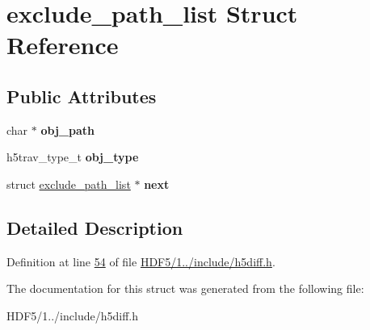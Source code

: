 \hypertarget{structexclude__path__list}{}\section{exclude\+\_\+path\+\_\+list Struct Reference}
\label{structexclude__path__list}
\subsection*{Public Attributes}
\begin{DoxyCompactItemize}
\item 
\mbox{\label{structexclude__path__list_a0157dcb15f3e49e223ed56a7cedceeb7}} 
char $\ast$ {\bfseries obj\+\_\+path}
\item 
\mbox{\label{structexclude__path__list_ae5cb2bf26a07b1663dd487aa71bb039b}} 
h5trav\+\_\+type\+\_\+t {\bfseries obj\+\_\+type}
\item 
\mbox{\label{structexclude__path__list_a2f3f2001e98c8ed7c3cad97385708e04}} 
struct \hyperlink{structexclude__path__list}{exclude\+\_\+path\+\_\+list} $\ast$ {\bfseries next}
\end{DoxyCompactItemize}


\subsection{Detailed Description}


Definition at line \hyperlink{_h_d_f5_21_810_81_2include_2h5diff_8h_source_l00054}{54} of file \hyperlink{_h_d_f5_21_810_81_2include_2h5diff_8h_source}{H\+D\+F5/1../include/h5diff.\+h}.



The documentation for this struct was generated from the following file\+:\begin{DoxyCompactItemize}
\item 
H\+D\+F5/1../include/h5diff.\+h\end{DoxyCompactItemize}
